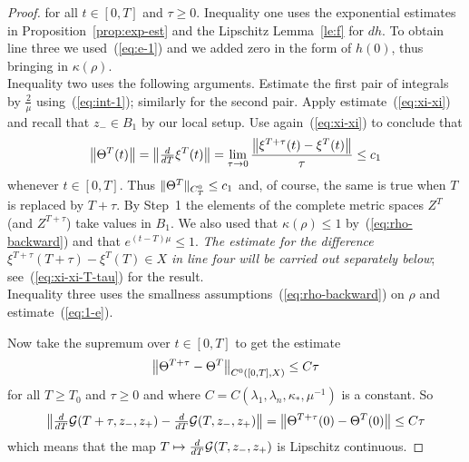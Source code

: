 \documentclass{article}
\begin{document}
\begin{proof}
for all $t\in[0,T]$ and $\tau\ge 0$. Inequality one uses the
exponential estimates in Proposition~\ref{prop:exp-est} and the Lipschitz
Lemma~\ref{le:f} for $dh$. To obtain line three we used~(\ref{eq:e-1})
and we added zero in the form of $h(0)$, thus bringing in $\kappa(\rho)$.
\\
Inequality two uses the following arguments. Estimate the first pair of integrals by $\frac{2}{\mu}$
using~(\ref{eq:int-1}); similarly for the second pair. Apply estimate~(\ref{eq:xi-xi}) and
recall that ${z_-}\in B_1$ by our local setup. Use again~(\ref{eq:xi-xi}) to conclude that
\begin{equation}\label{eq:Theta-good!}
     \Norm{\Theta^T(t)}
     =\Norm{\tfrac{d}{dT}\xi^{T}(t)}
     =\lim_{\tau\to 0}
     \frac{\Norm{\xi^{T+\tau}(t)-\xi^T(t)}}{\tau}
     \le{c_1}
\end{equation}
whenever $t\in[0,T]$. Thus
$
     \mathopen\|\Theta^T\mathclose\|_{C^0_T}\le {c_1}
$
and, of course, the same is true when $T$ is replaced by $T+\tau$. By Step~1
the elements of the complete metric spaces $Z^T$ (and $Z^{T+\tau}$) take
values in $B_1$. We also used that $\kappa(\rho)\le1$
by~(\ref{eq:rho-backward}) and that $e^{(t-T)\mu}\le1$.
{\it The estimate for the difference
$\xi^{T+\tau}(T+\tau)-\xi^T(T)\in X$ in line four
will be carried out separately below};
see~(\ref{eq:xi-xi-T-tau}) for the result.
\\
Inequality three uses the smallness assumptions~(\ref{eq:rho-backward}) on $\rho$ and
estimate~(\ref{eq:1-e}). 

Now take the supremum over $t\in[0,T]$ to get the estimate
\begin{equation}\label{eq:V-V}
     \Norm{\Theta^{T+\tau}-\Theta^T}_{C^0([0,T],X)}
     \le C \tau
\end{equation}
for all $T\ge T_0$ and $\tau\ge0$ and where
$C=C(\lambda_1,\lambda_n,\kappa_*,\mu^{-1})$ is a constant. So
\begin{equation*}
     \left\|\tfrac{d}{dT}{\mathcal{G}}(T+\tau,{z_-},z_+)-\tfrac{d}{dT}{\mathcal{G}}(T,{z_-},z_+)\right\|
     =\left\|\Theta^{T+\tau}(0)-\Theta^T(0)\right\|
     \le C\tau
\end{equation*}
which means that the map $T\mapsto \frac{d}{dT}{\mathcal{G}}(T,{z_-},z_+)$ is Lipschitz continuous.


\end{proof}
\end{document}
